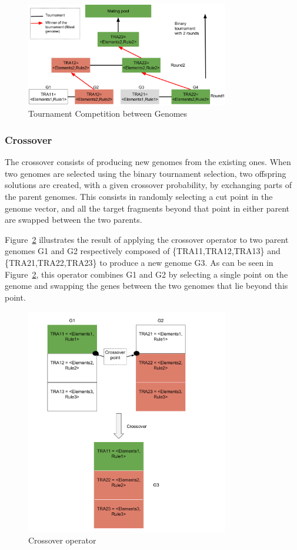 \documentclass[conference]{IEEEtran}
\begin{document}
\begin{figure}[!t]
\centering
\includegraphics[width=3.49in]{bt.pdf}
\caption{Tournament Competition between Genomes}
\label{binary}
\end{figure}


\subsubsection{\textbf{Crossover}}
The crossover consists of producing new genomes from the existing ones. When two genomes are selected using the binary tournament selection, two offspring solutions are created, with a given crossover probability, by exchanging parts of the parent genomes. This consists in randomly selecting a cut point in the genome vector, and all the target fragments beyond that point in either parent are swapped between the two parents.

Figure~\ref{crossover} illustrates the result of applying the crossover operator to two parent genomes G1 and G2 respectively composed of \{TRA11,TRA12,TRA13\} and \{TRA21,TRA22,TRA23\} to produce a new genome G3. As can be seen in Figure~\ref{crossover}, this operator combines G1 and G2 by selecting a single point on the genome and swapping the genes between the two genomes that lie beyond this point. 

\begin{figure}[!t]
\centering
\includegraphics[width=3.49in]{crossover.pdf}
\caption{Crossover operator}
\label{crossover}
\end{figure}
\end{document}

